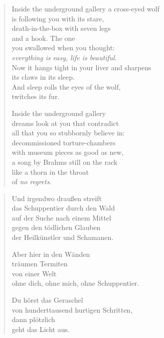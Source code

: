 \begin{verse}

Inside the underground gallery a cross-eyed wolf\\
is following you with its stare,\\
death-in-the-box with seven legs\\
and a hook. The one\\
you swallowed when you thought:\\
\emph{everything is easy, life is beautiful}.\\
Now it hangs tight in your liver and sharpens\\
its claws in its sleep.\\
And sleep rolls the eyes of the wolf,\\
twitches its fur.

Inside the underground gallery\\
dreams look at you that contradict\\
all that you so stubbornly believe in:\\
decommissioned torture-chambers\\
with museum pieces as good as new,\\
a song by Brahms still on the rack\\
like a thorn in the throat\\
of \emph{no regrets}.

\end{verse}

\clearpage

\begin{verse}

Und irgendwo draußen streift\\
das Schuppentier durch den Wald\\
auf der Suche nach einem Mittel\\
gegen den tödlichen Glauben\\
der Heilkünstler und Schamanen.

Aber hier in den Wänden\\
träumen Termiten\\
von einer Welt\\
ohne dich, ohne mich, ohne Schuppentier.

Du hörst das Geraschel\\
von hunderttausend hurtigen Schritten,\\
dann plötzlich\\
geht das Licht aus.

\end{verse}

